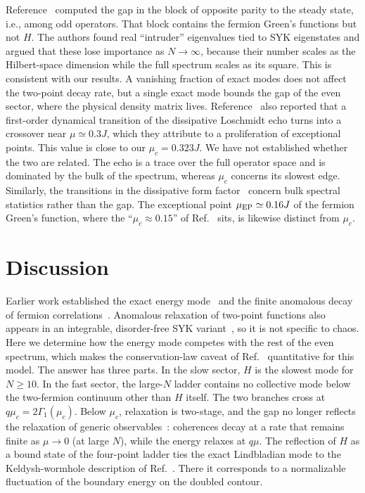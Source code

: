 \documentclass[aps,pre,twocolumn,superscriptaddress,amsmath,amssymb,10pt]{revtex4-2}
\begin{document}
Reference~\cite{Zheng2026} computed the gap in the block of opposite parity to the steady state, i.e., among odd operators. That block contains the fermion Green's functions but not $H$. The authors found real ``intruder'' eigenvalues tied to SYK eigenstates and argued that these lose importance as $N\to\infty$, because their number scales as the Hilbert-space dimension while the full spectrum scales as its square. This is consistent with our results. A vanishing fraction of exact modes does not affect the two-point decay rate, but a single exact mode bounds the gap of the even sector, where the physical density matrix lives. Reference~\cite{Zheng2026} also reported that a first-order dynamical transition of the dissipative Loschmidt echo turns into a crossover near $\mu\simeq0.3J$, which they attribute to a proliferation of exceptional points. This value is close to our $\mu_c=0.323J$. We have not established whether the two are related. The echo is a trace over the full operator space and is dominated by the bulk of the spectrum, whereas $\mu_c$ concerns its slowest edge. Similarly, the transitions in the dissipative form factor~\cite{Kawabata2023} concern bulk spectral statistics rather than the gap. The exceptional point $\mu_{\rm EP}\simeq0.16J$ of the fermion Green's function, where the ``$\mu_c\approx0.15$'' of Ref.~\cite{Garcia2023} sits, is likewise distinct from $\mu_c$.

\section{Discussion}

Earlier work established the exact energy mode~\cite{Garcia2026} and the finite anomalous decay of fermion correlations~\cite{Garcia2023,Kulkarni2022}. Anomalous relaxation of two-point functions also appears in an integrable, disorder-free SYK variant~\cite{Ozaki2026}, so it is not specific to chaos. Here we determine how the energy mode competes with the rest of the even spectrum, which makes the conservation-law caveat of Ref.~\cite{Yoshimura2024} quantitative for this model. The answer has three parts. In the slow sector, $H$ is the slowest mode for $N\ge10$. In the fast sector, the large-$N$ ladder contains no collective mode below the two-fermion continuum other than $H$ itself. The two branches cross at $q\mu_c=2\Gamma_1(\mu_c)$. Below $\mu_c$, relaxation is two-stage, and the gap no longer reflects the relaxation of generic observables~\cite{MoriShirai2020}: coherences decay at a rate that remains finite as $\mu\to0$ (at large $N$), while the energy relaxes at $q\mu$. The reflection of $H$ as a bound state of the four-point ladder ties the exact Lindbladian mode to the Keldysh-wormhole description of Ref.~\cite{Garcia2023}. There it corresponds to a normalizable fluctuation of the boundary energy on the doubled contour.
\end{document}
